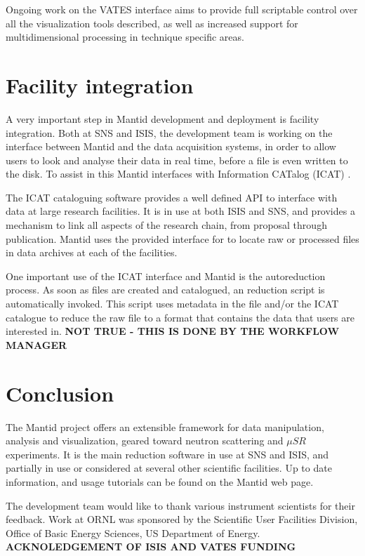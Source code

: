 \documentclass{elsarticle}
\begin{document}
Ongoing work on the VATES interface aims to provide full scriptable control over all the visualization tools described, as well as increased support for multidimensional processing in technique specific areas. 

\section{Facility integration}
A very important step in Mantid development and deployment is facility integration. Both at SNS and ISIS, the development team is working on the interface between Mantid and the data acquisition systems, in order to allow users to look and analyse their data in real time, before a file is even written to the disk. To assist in this Mantid interfaces with Information CATalog (ICAT) \cite{ICAT}.

The ICAT cataloguing software provides a well defined API to interface with data at large research facilities. It is in use at both ISIS and SNS, and provides a mechanism to link all aspects of the research chain, from proposal through publication. Mantid uses the provided interface for to locate raw or processed files in data archives at each of the facilities.

One important use of the ICAT interface and Mantid is the autoreduction process. As soon as files are created and catalogued, an reduction script is automatically invoked. This script uses metadata in the file and/or the ICAT catalogue to reduce the raw file to a format that contains the data that users are interested in. {\bf NOT TRUE - THIS IS DONE BY THE WORKFLOW MANAGER}



\section{Conclusion}
The Mantid project offers an extensible framework for data manipulation, analysis and visualization, geared toward neutron scattering and $\mu SR$ experiments. It is the main reduction software in use at SNS and ISIS, and partially in use or considered at several other scientific facilities. Up to date information, and usage tutorials can be found on the Mantid web page\cite{webpage}. 

The development team would like to thank various instrument scientists for their feedback. Work at ORNL was sponsored by the Scientific User Facilities Division, Office of Basic Energy Sciences, US Department of Energy. {\bf ACKNOLEDGEMENT OF ISIS AND VATES FUNDING}
\end{document}
